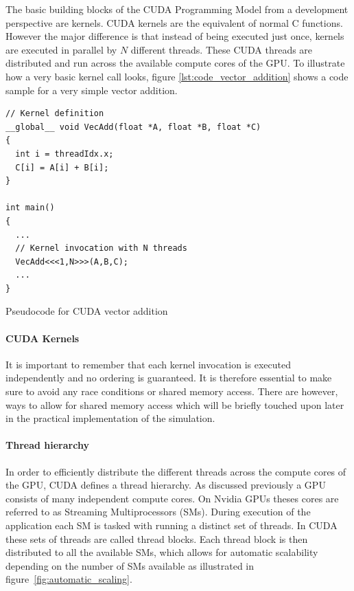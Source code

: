 \documentclass[a4paper,11pt]{kth-mag}
\begin{document}
The basic building blocks of the CUDA Programming Model from a development perspective are kernels. CUDA kernels are the equivalent of normal C functions. However the major difference is that instead of being executed just once, kernels are executed in parallel by $N$ different threads. These CUDA threads are distributed and run across the available compute cores of the GPU. To illustrate how a very basic kernel call looks, figure \ref{lst:code_vector_addition} shows a code sample for a very simple vector addition.

\begin{listing}[!htbp]
  \centering
  \begin{verbatim}
// Kernel definition
__global__ void VecAdd(float *A, float *B, float *C)
{
  int i = threadIdx.x;
  C[i] = A[i] + B[i];
}

int main()
{
  ...
  // Kernel invocation with N threads
  VecAdd<<<1,N>>>(A,B,C);
  ...
}
  \end{verbatim}
  \caption{Pseudocode for CUDA vector addition}
  \label{lst:code_vector_addition}
\end{listing}

\paragraph{CUDA Kernels}

It is important to remember that each kernel invocation is executed independently and no ordering is guaranteed. It is therefore essential to make sure to avoid any race conditions or shared memory access. There are however, ways to allow for shared memory access which will be briefly touched upon later in the practical implementation of the simulation.

\paragraph{Thread hierarchy}

In order to efficiently distribute the different threads across the compute cores of the GPU, CUDA defines a thread hierarchy. As discussed previously a GPU consists of many independent compute cores. On Nvidia GPUs theses cores are referred to as Streaming Multiprocessors (SMs). During execution of the application each SM is tasked with running a distinct set of threads. In CUDA these sets of threads are called thread blocks. Each thread block is then distributed to all the available SMs, which allows for automatic scalability depending on the number of SMs available  as illustrated in figure~\ref{fig:automatic_scaling}.
\end{document}
